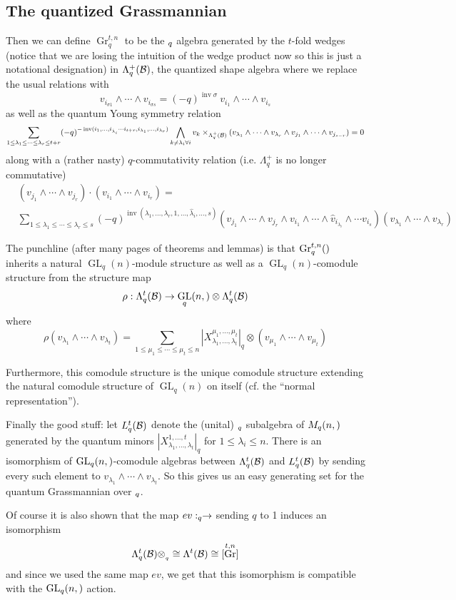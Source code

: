 \documentclass[12pt]{article}
\DeclareMathOperator{\Gr}{Gr}
\DeclareMathOperator{\GL}{GL}
\DeclareMathOperator{\inv}{inv}
\let\k\relax
\newcommand{\k}{\mathbbm{k}}
\begin{document}
\subsection{The quantized Grassmannian}
Then we can define $\Gr_q^{t,n}$ to be the $\k_q$ algebra generated by the $t$-fold wedges (notice that we are losing the intuition of the wedge product now so this is just a notational designation)
in $\Lambda_q^+(\mathcal{B})$,
the quantized shape algebra where we replace the usual relations with
\[v_{i_{\sigma 1}}\wedge\cdots\wedge v_{i_{\sigma s}}=(-q)^{\inv\sigma}\  v_{i_1}\wedge\cdots\wedge v_{i_s}\]
as well as the quantum Young symmetry relation
\[\sum_{1\le \lambda_1\le\cdots\le\lambda_r\le t+r}(-q)^{-\inv(i_1,\dots,i_{\hat\lambda_i}\cdots i_{t+r},i_{\lambda_1},\dots,i_{\lambda_r})}\bigwedge_{k\ne \lambda_i \forall i}v_{k}\times_{\Lambda_q^+(\calB)}(v_{\lambda_1}\wedge\cdots\wedge v_{\lambda_r}\wedge v_{j_1}\wedge\cdots\wedge v_{j_{s-r}})=0\]
along with a (rather nasty) $q$-commutativity relation (i.e. $\Lambda_q^+$ is no longer commutative)
\begin{align*}
	&(v_{j_1}\wedge\cdots\wedge v_{j_r})\cdot (v_{i_1}\wedge\cdots\wedge v_{i_r})=\\
	&\sum_{1\le \lambda_1\le\cdots\le\lambda_r\le s}(-q)^{\inv(\lambda_1,\dots,\lambda_r,1,\dots,\hat\lambda_i,\dots,s)}(v_{j_1}\wedge\cdots\wedge v_{j_r}\wedge v_{i_1}\wedge\cdots\wedge\hat v_{i_{\lambda_i}}\wedge\cdots v_{i_s})(v_{\lambda_1}\wedge\cdots\wedge v_{\lambda_r})
\end{align*}

The punchline (after many pages of theorems and lemmas) is that $\Gr_q^{t,n}(\k)$ inherits a natural $\GL_q(n)$-module structure as well as a $\GL_q(n)$-comodule structure 
from the structure map 
\[\rho:\Lambda_q^t(\calB)\to \GL_q(n,\k)\otimes \Lambda_q^t(\calB)\]
where 
\[\rho(v_{\lambda_1}\wedge\cdots\wedge v_{\lambda_t})=\sum_{1\le \mu_1\le\cdots\le \mu_t\le n}|X^{\mu_1,\dots,\mu_t}_{\lambda_1,\dots,\lambda_t}|_q\otimes(v_{\mu_1}\wedge\cdots\wedge v_{\mu_t})\]

Furthermore, this comodule structure is the unique comodule structure extending the natural comodule structure of $\GL_q(n)$ on itself (cf. the ``normal representation'').

Finally the good stuff: let $L_q^t(\mathcal{B})$ denote the (unital) $\k_q$ subalgebra of $M_q(n,\k)$ generated 
by the quantum minors $|X^{1,\dots,t}_{\lambda_1,\dots,\lambda_t}|_q$ for $1\le \lambda_i\le n$. There is an isomorphism of $\GL_q(n,\k)$-comodule algebras 
between $\Lambda^t_q(\mathcal{B})$ and $L^t_q(\mathcal{B})$ by sending every such element to $v_{\lambda_1}\wedge\cdots\wedge v_{\lambda_t}$. So this gives us an easy generating set 
for the quantum Grassmannian over $\k_q$.

Of course it is also shown that the map $ev:\k_q\to \k$ sending $q$ to 1 induces an isomorphism 
\[\Lambda_q^t(\calB)\otimes_{\k_q}\k\cong \Lambda^t(\calB)\cong \k[\Gr^{t,n}]\]
and since we used the same map $ev$, we get that this isomorphism is compatible with the $\GL_q(n,\k)$ action.
\medskip

\printbibliography
\end{document}
